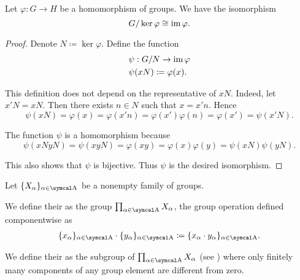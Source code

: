 \begin{theorem}\label{thm:homomorphism_theorem_for_groups}
  Let \( \varphi: G \to H \) be a homomorphism of groups. We have the isomorphism
  \begin{equation*}
    G / \ker \varphi \cong \operatorname{im} \varphi.
  \end{equation*}
\end{theorem}
\begin{proof}
  Denote \( N \coloneqq \ker \varphi \). Define the function
  \begin{align*}
    &\psi: G / N \to \operatorname{im} \varphi \\
    &\psi(xN) \coloneqq \varphi(x).
  \end{align*}

  This definition does not depend on the representative of \( xN \). Indeed, let \( x'N = xN \). Then there exists \( n \in N \) such that \( x = x' n \). Hence
  \begin{equation*}
    \psi(xN) = \varphi(x) = \varphi(x' n) = \varphi(x') \varphi(n) = \varphi(x') = \psi(x'N).
  \end{equation*}

  The function \( \psi \) is a homomorphism because
  \begin{equation*}
    \psi(xN yN) = \psi(xyN) = \varphi(xy) = \varphi(x) \varphi(y) = \psi(xN) \psi(yN).
  \end{equation*}

  This also shows that \( \psi \) is bijective. Thus \( \psi \) is the desired isomorphism.
\end{proof}

\begin{definition}\label{def:group_direct_product}
  Let \( \{ X_\al \}_{\al \in \CA} \) be a nonempty family of groups.

  We define their  as the group \( \prod_{\al \in \CA} X_\al \), the group operation defined componentwise as
  \begin{align*}
    \{ x_\al \}_{\al \in \CA} \cdot \{ y_\al \}_{\al \in \CA}
    \coloneqq
    \{ x_\al \cdot y_\al \}_{\al \in \CA}.
  \end{align*}

  We define their  as the subgroup of \( \prod_{\al \in \CA} X_\al \) (see ) where only finitely many components of any group element are different from zero.
\end{definition}

